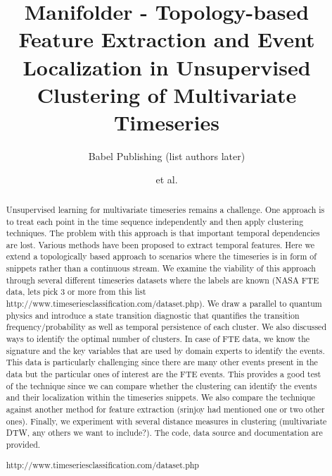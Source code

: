 \documentclass[aps,preprint,superscriptaddress]{revtex4}
\begin{document}
\title{Manifolder - Topology-based Feature Extraction and Event Localization in Unsupervised Clustering of Multivariate Timeseries}

\author{Babel Publishing (list authors later)}
\author{et al.}


\begin{abstract}

Unsupervised learning for multivariate timeseries remains a challenge. One approach is to treat each point in the time sequence independently and then apply clustering techniques. The problem with this approach is that important temporal dependencies are lost. Various methods have been proposed to extract temporal features. Here we extend a topologically based approach to scenarios where the timeseries is in form of snippets rather than a continuous stream. We examine the viability of this approach through several different timeseries datasets where the labels are known (NASA FTE data, lets pick 3 or more from this list http://www.timeseriesclassification.com/dataset.php). We draw a parallel to quantum physics and introduce a state transition diagnostic that quantifies the transition frequency/probability as well as temporal persistence of each cluster. We also discussed ways to identify the optimal number of clusters. In case of FTE data, we know the signature and the key variables that are used by domain experts to identify the events. This data is particularly challenging since there are many other events present in the data but the particular ones of interest are the FTE events. This provides a good test of the technique since we can compare whether the clustering can identify the events and their localization within the timeseries snippets.
We also compare the technique against another method for feature extraction (srinjoy had mentioned one or two other ones). Finally, we experiment with several distance measures in clustering (multivariate DTW, any others we want to include?). 
The code, data source and documentation are provided.

http://www.timeseriesclassification.com/dataset.php

\end{abstract}

\maketitle

\end{document}
